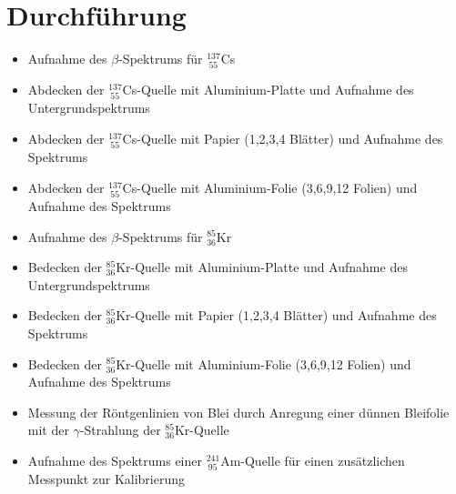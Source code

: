 \documentclass[german,  %
parskip=full,  %
]{scrartcl}
\begin{document}
\section{Durchführung}
\begin{itemize}
\item Aufnahme des $\beta$-Spektrums für $^{137}_{\ 55}$Cs
\item Abdecken der $^{137}_{\ 55}$Cs-Quelle mit Aluminium-Platte und Aufnahme des Untergrundspektrums
\item Abdecken der $^{137}_{\ 55}$Cs-Quelle mit Papier (1,2,3,4 Blätter) und Aufnahme des Spektrums
\item Abdecken der $^{137}_{\ 55}$Cs-Quelle mit Aluminium-Folie (3,6,9,12 Folien) und Aufnahme des Spektrums
\item Aufnahme des $\beta$-Spektrums für $^{85}_{36}$Kr
\item Bedecken der $^{85}_{36}$Kr-Quelle mit Aluminium-Platte und Aufnahme des Untergrundspektrums
\item Bedecken der $^{85}_{36}$Kr-Quelle mit Papier (1,2,3,4 Blätter) und Aufnahme des Spektrums
\item Bedecken der $^{85}_{36}$Kr-Quelle mit Aluminium-Folie (3,6,9,12 Folien) und Aufnahme des Spektrums
\item Messung der Röntgenlinien von Blei durch Anregung einer dünnen Bleifolie mit der \(\gamma\)-Strahlung der $^{85}_{36}$Kr-Quelle
\item Aufnahme des Spektrums einer \(^{241}_{\ 95}\)Am-Quelle für einen zusätzlichen Messpunkt zur Kalibrierung
\end{itemize}

\newpage
\end{document}
